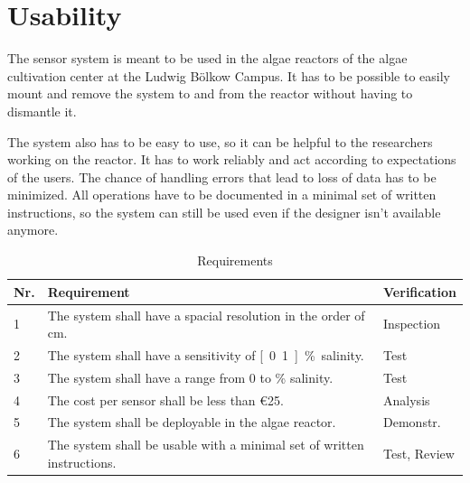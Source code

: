 \section{Usability}

The sensor system is meant to be used in the algae reactors of the algae cultivation center at the Ludwig Bölkow Campus. It has to be possible to easily mount and remove the system to and from the reactor without having to dismantle it.

The system also has to be easy to use, so it can be helpful to the researchers working on the reactor. It has to work reliably and act according to expectations of the users. The chance of handling errors that lead to loss of data has to be minimized. All operations have to be documented in a minimal set of written instructions, so the system can still be used even if the designer isn't available anymore.

\begin{table}[H]
    \centering

    \caption[Requirements]{Requirements}
    \label{tab:req}
    \begin{tabular}{lp{}l}
        	\toprule
        	Nr. & Requirement & Verification \tabularnewline
        	\midrule
		1 & The system shall have a spacial resolution in the order of \unit[1]{cm}. & Inspection \tabularnewline
		2 & The system shall have a sensitivity of  \unit[0.1]{\%} salinity.  & Test \tabularnewline
		3 & The system shall have a range from 0 to \unit[5]{\%} salinity.  & Test \tabularnewline
		4 & The cost per sensor shall be less than \euro{25}.  & Analysis \tabularnewline
		5 & The system shall be deployable in the algae reactor. & Demonstr. \tabularnewline
		6 & The system shall be usable with a minimal set of written instructions. & Test, Review \tabularnewline
        \bottomrule
    \end{tabular}
\end{table}